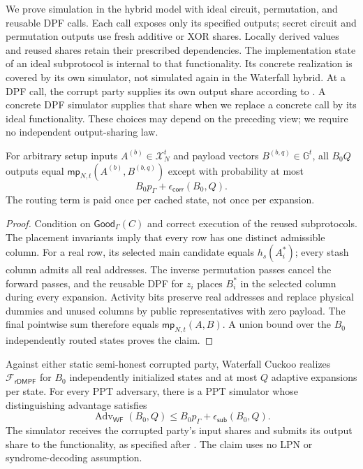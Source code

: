 We prove simulation in the hybrid model with ideal circuit, permutation, and
reusable DPF calls.  Each call exposes only its specified outputs; secret
circuit and permutation outputs use fresh additive or XOR shares.  Locally
derived values and reused shares retain their prescribed dependencies.
The implementation state of an ideal subprotocol is internal to that
functionality.  Its concrete realization is covered by its own simulator,
not simulated again in the Waterfall hybrid.
At a DPF call, the corrupt party supplies its own output share according to
. A concrete DPF simulator supplies that share when
we replace a concrete call by its ideal functionality. These choices may
depend on the preceding view; we require no independent output-sharing law.

\begin{proposition}\label{prop:waterfall-correctness}
For arbitrary setup inputs $A^{(b)}\in\mathcal X_N^t$ and payload vectors
$B^{(b,q)}\in\mathbb G^t$, all $B_0Q$ outputs equal
$\mathsf{mp}_{N,t}(A^{(b)},B^{(b,q)})$ except with probability at most
\[
 B_0p_\Gamma+\epsilon_{\mathsf{corr}}(B_0,Q).
\]
The routing term is paid once per cached state, not once per expansion.
\end{proposition}

\begin{proof}
Condition on $\mathsf{Good}_\Gamma(C)$ and correct execution of the reused
subprotocols.  The placement invariants imply that every row has one distinct
admissible column.  For a real row, its selected main candidate equals
$h_s(A_i^*)$; every stash column admits all real addresses.  The inverse
permutation passes cancel the forward passes, and the reusable DPF for $z_i$
places $B_i^*$ in the selected column during every expansion.  Activity bits
preserve real addresses and replace physical dummies and unused columns by
public representatives with zero payload.  The final pointwise sum therefore
equals $\mathsf{mp}_{N,t}(A,B)$.  A union bound over the $B_0$ independently
routed states proves the claim.
\end{proof}

\begin{theorem}
\label{thm:waterfall-simulation}
Against either static semi-honest corrupted party, Waterfall Cuckoo realizes
$\mathcal F_{\mathsf{rDMPF}}$ for $B_0$ independently initialized states and
at most $Q$ adaptive expansions per state.  For every PPT adversary, there is
a PPT simulator whose distinguishing advantage satisfies
\begin{equation}\label{eq:waterfall-batch-security}
 \operatorname{Adv}_{\mathsf{WF}}(B_0,Q)
 \leq B_0p_\Gamma+\epsilon_{\mathsf{sub}}(B_0,Q).
\end{equation}
The simulator receives the corrupted party's input shares and submits its
output share to the functionality, as specified after .
The claim uses no LPN or
syndrome-decoding assumption.
\end{theorem}

